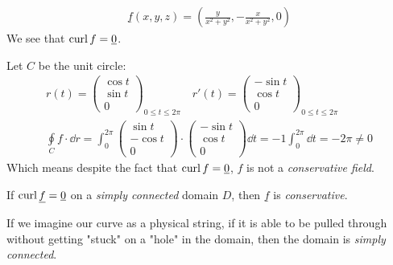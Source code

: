 \documentclass[00_complete]{subfiles}
\begin{document}
\begin{example}
    \begin{gather*}
        \underline f (x,y,z)=\left(\frac{y}{x^2+y^2},-\frac{x}{x^2+y^2},0\right)
    \end{gather*}
    We see that $\operatorname{curl} f = \underline 0$.

    Let $C$ be the unit circle:
    \begin{gather*}
        r(t)=\begin{pmatrix}
            \cos t \\ \sin t \\ 0
        \end{pmatrix}_{0 \leq t \leq 2\pi} \quad
        r'(t)=\begin{pmatrix}
            -\sin t \\ \cos t \\ 0
        \end{pmatrix}_{0 \leq t \leq 2\pi} \\
        \oint\limits_C f \cdot \dd{r} = \int_{0}^{2\pi}\begin{pmatrix}
            \sin t \\ -\cos t \\ 0
        \end{pmatrix}\cdot \begin{pmatrix}
            -\sin t \\ \cos t \\ 0
        \end{pmatrix} \dd{t} = -1\int_{0}^{2\pi}\dd{t}=-2\pi \neq 0
    \end{gather*}
    Which means despite the fact that $\operatorname{curl} f = \underline 0$, $f$ is not a
    \emph{conservative field}.
\end{example}
If $\operatorname{curl} \underline f = \underline 0$ on a \emph{simply connected} domain $D$,
then $\underline f$ is \emph{conservative}.
\begin{definition}
    If we imagine our curve as a physical string, if it is able to be pulled
    through without getting "stuck" on a "hole" in the domain, then the domain
    is \emph{simply connected}.
\end{definition}
\end{document}
